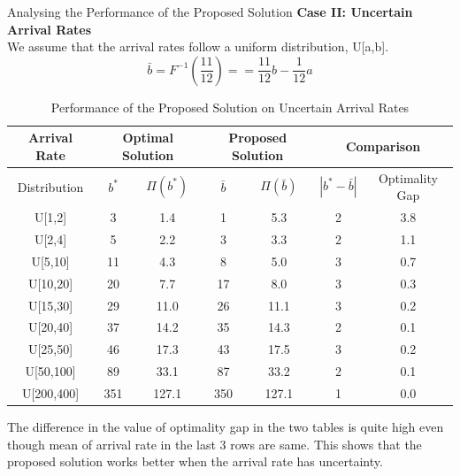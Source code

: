 \documentclass[9pt]{beamer}
\begin{document}
\begin{frame}{Analysing the Performance of the Proposed Solution}
\textbf{Case II: Uncertain Arrival Rates} \\
We assume that the arrival rates follow a uniform distribution, U[a,b].
\[\bar{b}=F^{-1}(\frac{11}{12})= =\frac{11}{12}b-\frac{1}{12}a \]
\begin{table}
\small
            \begin{tabular}{|c||c|c|c|c|c|c|}
            \hline
            Arrival Rate &  \multicolumn{2}{|c|}{Optimal Solution} & \multicolumn{2}{|c|}{Proposed Solution}& \multicolumn{2}{|c|}{Comparison} \\
            \hline
                Distribution& $b^*$ & $\Pi(b^*)$ & $\bar{b}$& $\Pi(\bar{b})$& $|b^*-\bar{b}|$& Optimality Gap\\ 
                    \hline \hline
                    U[1,2] & 3 & 1.4 & 1 & 5.3 & 2& 3.8\\ 
                    U[2,4] & 5 & 2.2 & 3 & 3.3 & 2& 1.1\\
                    U[5,10] & 11 & 4.3 & 8 & 5.0 & 3& 0.7\\
                    U[10,20] & 20 & 7.7 & 17 & 8.0 & 3& 0.3\\
                    U[15,30] & 29 & 11.0 & 26 & 11.1 & 3& 0.2\\
                    U[20,40] & 37 & 14.2 & 35 & 14.3 & 2& 0.1\\
                    U[25,50] & 46 & 17.3 & 43 & 17.5 & 3& 0.2\\
                    U[50,100] & 89 & 33.1 & 87 & 33.2 & 2& 0.1\\
                    U[200,400] & 351 & 127.1 & 350 & 127.1 & 1& 0.0\\
            \hline
            \end{tabular} 
            \caption{Performance of the Proposed Solution on Uncertain Arrival Rates}            
\end{table}
The difference in the value of optimality gap in the two tables is quite high even though mean of arrival rate in the last 3 rows are same. This shows that the proposed solution works better when the arrival rate has uncertainty.
\end{frame} 
\end{document}
